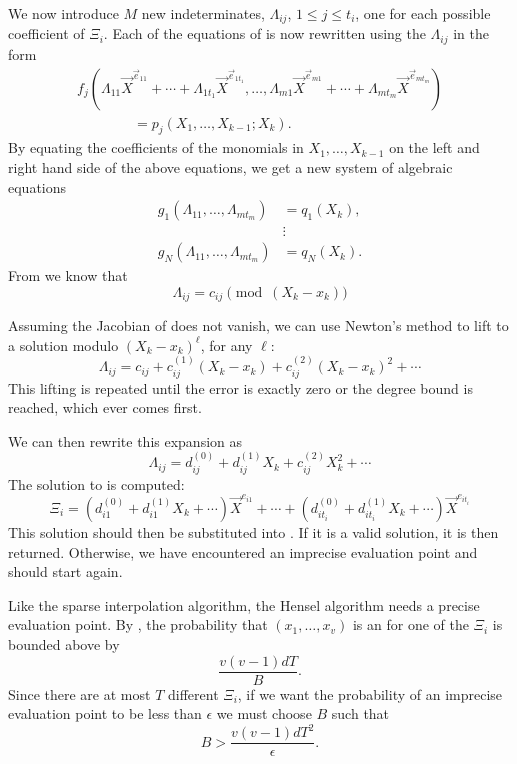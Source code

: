 We now introduce $M$ new indeterminates, $\Lambda_{ij}$, $1 \le j \le
t_i$, one for each possible coefficient of $\Xi_i$.  Each of the
equations of  is now rewritten using the
$\Lambda_{ij}$ in the form
\[
\begin{aligned}
f_j(\Lambda_{11} \vec{X}^{\vec{e}_{11}} + \cdots + \Lambda_{1t_1}
\vec{X}^{\vec{e}_{1t_1}}, \ldots, \Lambda_{m1} \vec{X}^{\vec{e}_{m1}}
+ \cdots + \Lambda_{mt_m} \vec{X}^{\vec{e}_{mt_m}}) \\
\qquad\qquad= p_j(X_1, \ldots, X_{k-1}; X_k).
\end{aligned}
\]
By equating the coefficients of the monomials in $X_1, \ldots,
X_{k-1}$ on the left and right hand side of the above equations, we
get a new system of algebraic equations
\begin{equation} \label{SPH:MVark+1:Eq}
\begin{aligned}
g_1(\Lambda_{11}, \ldots, \Lambda_{mt_m}) &= q_1(X_k), \\
& \vdots \\
g_N(\Lambda_{11}, \ldots, \Lambda_{mt_m}) &= q_N(X_k).
\end{aligned}
\end{equation}
From  we know that 
\begin{equation} \label{SPH:MVar:LInit:Eq}
\Lambda_{ij} = c_{ij} \pmod{(X_k - x_k)}
\end{equation}

Assuming the Jacobian of  does not vanish, we
can use Newton's method to lift  to a
solution modulo $(X_k-x_k)^{\ell}$, for any $\ell$:
\[
\Lambda_{ij} = c_{ij} + c_{ij}^{(1)} (X_k - x_k) 
+ c_{ij}^{(2)} (X_k - x_k)^2 + \cdots
\]
This lifting is repeated until the error is exactly zero or the degree
bound is reached, which ever comes first.

We can then rewrite this expansion as
\[
\Lambda_{ij} = d_{ij}^{(0)} + d_{ij}^{(1)} X_k  + c_{ij}^{(2)} X_k^2 + \cdots
\]
The solution to  is computed:
\[
\Xi_i = (d_{i1}^{(0)} + d_{i1}^{(1)} X_k  + \cdots) \vec{X}^{e_{i1}} +
\cdots +
(d_{it_i}^{(0)} + d_{it_i}^{(1)} X_k  + \cdots) \vec{X}^{e_{it_i}}
\]
This solution should then be substituted into .
If it is a valid solution, it is then returned.  Otherwise, we have
encountered an imprecise evaluation point and should start again.  

Like the sparse interpolation algorithm, the Hensel algorithm needs a
precise evaluation point.  By , the
probability that $(x_1, \ldots, x_v)$ is an  for one of the $\Xi_i$ is bounded above by
\[
\frac{v(v-1)dT}{B}.
\]
Since there are at most $T$ different $\Xi_i$, if we want the
probability of an imprecise evaluation point to be less than
$\epsilon$ we must choose $B$ such that
\[
B > \frac{v(v-1)dT^2}{\epsilon}.
\]

